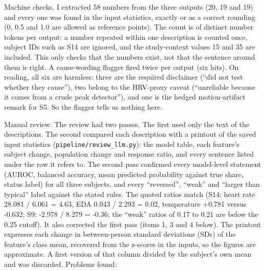 \documentclass[11pt]{article}
\begin{document}
Machine checks. I extracted 58 numbers from the three outputs (20, 19
and 19) and every one was found in the input statistics, exactly or as a
correct rounding (0, 0.5 and 1.0 are allowed as reference points). The
count is of distinct number tokens per output: a number repeated within
one description is counted once, subject IDs such as S14 are ignored,
and the study-context values 15 and 35 are included. This only checks
that the numbers exist, not that the sentence around them is right. A
cause-wording flagger fired twice per output (six hits). On reading, all
six are harmless: three are the required disclaimer (``did not test
whether they cause''), two belong to the HRV-proxy caveat (``unreliable
because it comes from a crude peak detector''), and one is the hedged
motion-artifact remark for S5. So the flagger tells us nothing here.

Manual review. The review had two passes. The first used only the text
of the descriptions. The second compared each description with a
printout of the saved input statistics
(\texttt{pipeline/review\_llm.py}): the model table, each feature's
subject change, population change and response ratio, and every sentence
listed under the row it refers to. The second pass confirmed every
model-level statement (AUROC, balanced accuracy, mean predicted
probability against true share, status label) for all three subjects,
and every ``reversed'', ``weak'' and ``larger than typical'' label
against the stated rules. The quoted ratios match (S14: heart rate
28.081 / 6.061 = 4.63, EDA 0.043 / 2.293 = 0.02, temperature +0.781
versus -0.632; S9: -2.978 / 8.279 = -0.36; the ``weak'' ratios of 0.17
to 0.21 are below the 0.25 cutoff). It also corrected the first pass
(items 1, 3 and 4 below). The printout expresses each change in
between-person standard deviations (SDs) of the feature's class mean,
recovered from the z-scores in the inputs, so the figures are
approximate. A first version of that column divided by the subject's own
mean and was discarded. Problems found:
\end{document}
